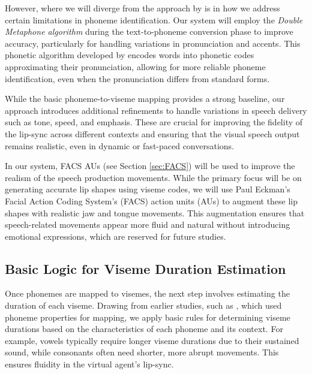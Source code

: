 \documentclass[12pt]{article}
\begin{document}
However, where we will diverge from the approach by \cite{Xu2013AGames} is in how we address certain limitations in phoneme identification. Our system will employ the \textit{Double Metaphone algorithm} during the text-to-phoneme conversion phase to improve accuracy, particularly for handling variations in pronunciation and accents. This phonetic algorithm developed by \cite{PhillipsScholar} encodes words into phonetic codes approximating their pronunciation, allowing for more reliable phoneme identification, even when the pronunciation differs from standard forms.

While the basic phoneme-to-viseme mapping provides a strong baseline, our approach introduces additional refinements to handle variations in speech delivery such as tone, speed, and emphasis. These are crucial for improving the fidelity of the lip-sync across different contexts and ensuring that the visual speech output remains realistic, even in dynamic or fast-paced conversations.

In our system, FACS AUs (see Section \ref{sec:FACS}) will be used to improve the realism of the speech production movements. While the primary focus will be on generating accurate lip shapes using viseme codes, we will use Paul Eckman's Facial Action Coding System's (FACS) action units (AUs)\cite{Ekman1978} to augment these lip shapes with realistic jaw and tongue movements. This augmentation ensures that speech-related movements appear more fluid and natural without introducing emotional expressions, which are reserved for future studies.

\subsection{Basic Logic for Viseme Duration Estimation}
Once phonemes are mapped to visemes, the next step involves estimating the duration of each viseme. Drawing from earlier studies, such as \cite{cappelletta2012}, which used phoneme properties for mapping, we apply basic rules for determining viseme durations based on the characteristics of each phoneme and its context. For example, vowels typically require longer viseme durations due to their sustained sound, while consonants often need shorter, more abrupt movements. This ensures fluidity in the virtual agent’s lip-sync.
\end{document}
